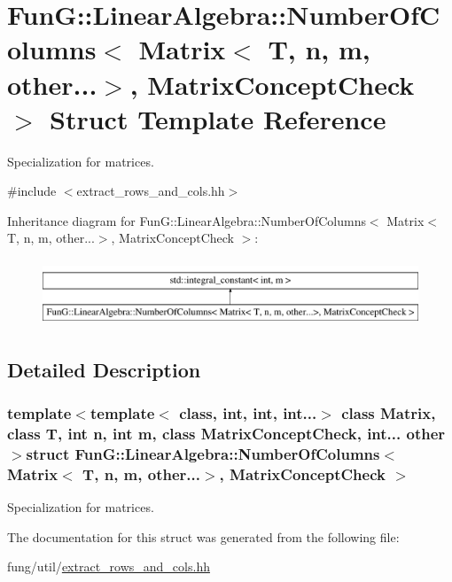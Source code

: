 \hypertarget{structFunG_1_1LinearAlgebra_1_1NumberOfColumns_3_01Matrix_3_01T_00_01n_00_01m_00_01other_8_8_8_4_00_01MatrixConceptCheck_01_4}{}\section{Fun\+G\+:\+:Linear\+Algebra\+:\+:Number\+Of\+Columns$<$ Matrix$<$ T, n, m, other...$>$, Matrix\+Concept\+Check $>$ Struct Template Reference}
\label{structFunG_1_1LinearAlgebra_1_1NumberOfColumns_3_01Matrix_3_01T_00_01n_00_01m_00_01other_8_8_8_4_00_01MatrixConceptCheck_01_4}


Specialization for matrices.  




{\ttfamily \#include $<$extract\+\_\+rows\+\_\+and\+\_\+cols.\+hh$>$}

Inheritance diagram for Fun\+G\+:\+:Linear\+Algebra\+:\+:Number\+Of\+Columns$<$ Matrix$<$ T, n, m, other...$>$, Matrix\+Concept\+Check $>$\+:\begin{figure}[H]
\begin{center}
\leavevmode
\includegraphics[height=2.000000cm]{structFunG_1_1LinearAlgebra_1_1NumberOfColumns_3_01Matrix_3_01T_00_01n_00_01m_00_01other_8_8_8_4_00_01MatrixConceptCheck_01_4}
\end{center}
\end{figure}


\subsection{Detailed Description}
\subsubsection*{template$<$template$<$ class, int, int, int...$>$ class Matrix, class T, int n, int m, class Matrix\+Concept\+Check, int... other$>$struct Fun\+G\+::\+Linear\+Algebra\+::\+Number\+Of\+Columns$<$ Matrix$<$ T, n, m, other...$>$, Matrix\+Concept\+Check $>$}

Specialization for matrices. 

The documentation for this struct was generated from the following file\+:\begin{DoxyCompactItemize}
\item 
fung/util/\hyperlink{extract__rows__and__cols_8hh}{extract\+\_\+rows\+\_\+and\+\_\+cols.\+hh}\end{DoxyCompactItemize}
